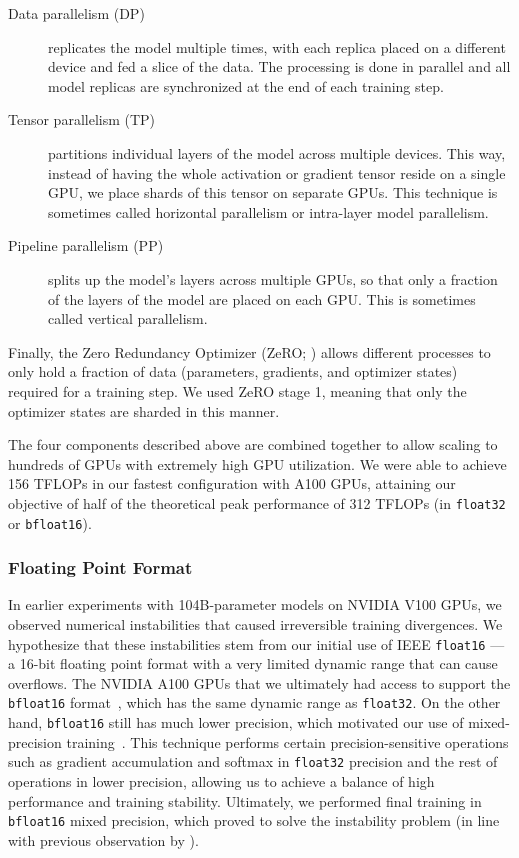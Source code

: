 \begin{description}
\item[Data parallelism (DP)] replicates the model multiple times, with each replica placed on a different device and fed a slice of the data. The processing is done in parallel and all model replicas are synchronized at the end of each training step.
\item[Tensor parallelism (TP)] partitions individual layers of the model across multiple devices. This way, instead of having the whole activation or gradient tensor reside on a single GPU, we place shards of this tensor on separate GPUs. This technique is sometimes called horizontal parallelism or intra-layer model parallelism.
\item[Pipeline parallelism (PP)] splits up the model's layers across multiple GPUs, so that only a fraction of the layers of the model are placed on each GPU. This is sometimes called vertical parallelism.
\end{description}

Finally, the Zero Redundancy Optimizer (ZeRO; \citealp{rajbhandari2020zero}) allows different processes to only hold a fraction of data (parameters, gradients, and optimizer states) required for a training step. We used ZeRO stage 1, meaning that only the optimizer states are sharded in this manner.

The four components described above are combined together to allow scaling to hundreds of GPUs with extremely high GPU utilization. We were able to achieve 156 TFLOPs in our fastest configuration with A100 GPUs, attaining our objective of half of the theoretical peak performance of 312 TFLOPs (in \texttt{float32} or \texttt{bfloat16}).

\subsubsection{Floating Point Format}

In earlier experiments with 104B-parameter models on NVIDIA V100 GPUs, we observed numerical instabilities that caused irreversible training divergences. We hypothesize that these instabilities stem from our initial use of IEEE \texttt{float16} --- a 16-bit floating point format with a very limited dynamic range that can cause overflows. The NVIDIA A100 GPUs that we ultimately had access to support the \texttt{bfloat16} format~\citep{bf16blog,kalamkar2019study}, which has the same dynamic range as \texttt{float32}.
On the other hand, \texttt{bfloat16} still has much lower precision, which motivated our use of mixed-precision training~\citep{micikevicius2018mixed}. This technique performs certain precision-sensitive operations such as gradient accumulation and softmax in \texttt{float32} precision and the rest of operations in lower precision, allowing us to achieve a balance of high performance and training stability. Ultimately, we performed final training in \texttt{bfloat16} mixed precision, which proved to solve the instability problem (in line with previous observation by \citealp{smith2022using}).

